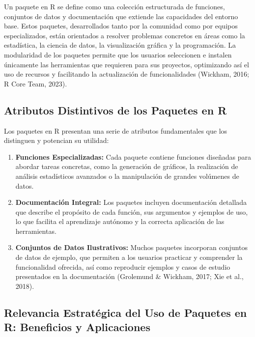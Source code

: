 \documentclass[
  spanish,
  a4paper,
  DIV=11,
  numbers=noendperiod,
  onepage,
  openany]{scrreprt}
\begin{document}
Un paquete en R se define como una colección estructurada de funciones,
conjuntos de datos y documentación que extiende las capacidades del
entorno base. Estos paquetes, desarrollados tanto por la comunidad como
por equipos especializados, están orientados a resolver problemas
concretos en áreas como la estadística, la ciencia de datos, la
visualización gráfica y la programación. La modularidad de los paquetes
permite que los usuarios seleccionen e instalen únicamente las
herramientas que requieren para sus proyectos, optimizando así el uso de
recursos y facilitando la actualización de funcionalidades (Wickham,
2016; R Core Team, 2023).

\subsection{Atributos Distintivos de los Paquetes en
R}\label{atributos-distintivos-de-los-paquetes-en-r}

Los paquetes en R presentan una serie de atributos fundamentales que los
distinguen y potencian su utilidad:

\begin{enumerate}
\def\labelenumi{\arabic{enumi}.}
\item
  \textbf{Funciones Especializadas:} Cada paquete contiene funciones
  diseñadas para abordar tareas concretas, como la generación de
  gráficos, la realización de análisis estadísticos avanzados o la
  manipulación de grandes volúmenes de datos.
\item
  \textbf{Documentación Integral:} Los paquetes incluyen documentación
  detallada que describe el propósito de cada función, sus argumentos y
  ejemplos de uso, lo que facilita el aprendizaje autónomo y la correcta
  aplicación de las herramientas.
\item
  \textbf{Conjuntos de Datos Ilustrativos:} Muchos paquetes incorporan
  conjuntos de datos de ejemplo, que permiten a los usuarios practicar y
  comprender la funcionalidad ofrecida, así como reproducir ejemplos y
  casos de estudio presentados en la documentación (Grolemund \&
  Wickham, 2017; Xie et al., 2018).
\end{enumerate}

\subsection{Relevancia Estratégica del Uso de Paquetes en R: Beneficios
y
Aplicaciones}\label{relevancia-estratuxe9gica-del-uso-de-paquetes-en-r-beneficios-y-aplicaciones}
\end{document}

